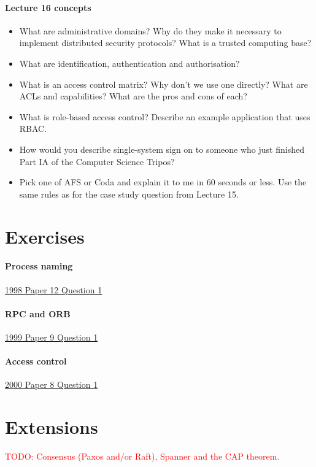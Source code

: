 \documentclass[12pt,a4paper,oneside,openright]{report}
\newcommand{\question}[2]{\paragraph{#1} #2}
\newcommand{\todo}[1]{\textcolor{red}{TODO: #1}}
\begin{document}
\question{Lecture 16 concepts}{
  \begin{itemize}
  \item What are administrative domains? Why do they make it necessary
    to implement distributed security protocols? What is a trusted
    computing base?
  \item What are identification, authentication and authorisation?
  \item What is an access control matrix? Why don't we use one
    directly? What are ACLs and capabilities? What are the pros and
    cons of each?
  \item What is role-based access control? Describe an example
    application that uses RBAC.
  \item How would you describe single-system sign on to someone who
    just finished Part IA of the Computer Science Tripos?
  \item Pick one of AFS or Coda and explain it to me in 60 seconds or
    less. Use the same rules as for the case study question from
    Lecture 15.
  \end{itemize}
}

\section{Exercises}

\question{Process
  naming}{\href{https://www.cl.cam.ac.uk/teaching/exams/pastpapers/y1998p12q1.pdf}{1998
    Paper 12 Question 1}}

\question{RPC and
  ORB}{\href{https://www.cl.cam.ac.uk/teaching/exams/pastpapers/y1999p9q1.pdf}{1999
    Paper 9 Question 1}}

\question{Access
  control}{\href{https://www.cl.cam.ac.uk/teaching/exams/pastpapers/y2000p8q1.pdf}{2000
    Paper 8 Question 1}}

\section{Extensions}

\todo{Consensus (Paxos and/or Raft), Spanner and the CAP theorem.}




\end{document}
